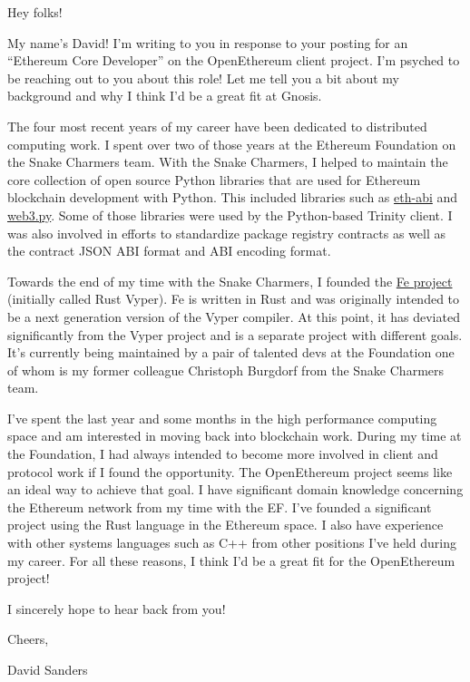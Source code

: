 \documentclass[12pt]{article}
\begin{document}
\noindent Hey folks!

\vspace{\baselineskip}
My name's David!  I'm writing to you in response to your posting for an
``Ethereum Core Developer'' on the OpenEthereum client project.  I'm psyched to
be reaching out to you about this role!  Let me tell you a bit about my
background and why I think I'd be a great fit at Gnosis.

The four most recent years of my career have been dedicated to distributed
computing work.  I spent over two of those years at the Ethereum Foundation on
the Snake Charmers team.  With the Snake Charmers, I helped to maintain the
core collection of open source Python libraries that are used for Ethereum
blockchain development with Python.  This included libraries such as
\href{https://github.com/ethereum/eth-abi}{eth-abi} and
\href{https://github.com/ethereum/web3.py}{web3.py}.  Some of those libraries
were used by the Python-based Trinity client.  I was also involved in efforts
to standardize package registry contracts as well as the contract JSON ABI
format and ABI encoding format.

Towards the end of my time with the Snake Charmers, I founded the
\href{https://github.com/ethereum/fe}{Fe project} (initially called Rust
Vyper).  Fe is written in Rust and was originally intended to be a next
generation version of the Vyper compiler.  At this point, it has deviated
significantly from the Vyper project and is a separate project with different
goals.  It's currently being maintained by a pair of talented devs at the
Foundation one of whom is my former colleague Christoph Burgdorf from the Snake
Charmers team.

I've spent the last year and some months in the high performance computing
space and am interested in moving back into blockchain work.  During my time at
the Foundation, I had always intended to become more involved in client and
protocol work if I found the opportunity.  The OpenEthereum project seems like
an ideal way to achieve that goal.  I have significant domain knowledge
concerning the Ethereum network from my time with the EF\@.  I've founded a
significant project using the Rust language in the Ethereum space.  I also have
experience with other systems languages such as C++ from other positions I've
held during my career.  For all these reasons, I think I'd be a great fit for
the OpenEthereum project!

I sincerely hope to hear back from you!

\vspace{\baselineskip}
\noindent Cheers,

\noindent David Sanders
\end{document}
